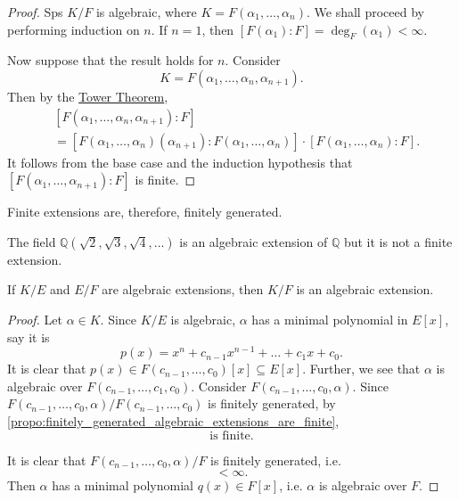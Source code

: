 \documentclass[notoc,notitlepage,nobib]{tufte-book}
\begin{document}
\begin{proof}
  Sps $K / F$ is algebraic, where $K = F(\alpha_1, \ldots, \alpha_n)$. We shall proceed by performing
  induction on $n$. If $n = 1$, then $[F(\alpha_1) : F] = \deg_F(\alpha_1) < \infty$.

  Now suppose that the result holds for $n$. Consider 
  \begin{equation*}
    K = F(\alpha_1, \ldots, \alpha_n, \alpha_{n + 1}).
  \end{equation*}
  Then by the \hyperref[thm:tower_theorem]{Tower Theorem},
  \begin{align*}
    &[F(\alpha_1, \ldots, \alpha_n, \alpha_{n + 1}) : F] \\
    &= [F(\alpha_1, \ldots, \alpha_{n})(\alpha_{n + 1}) : F(\alpha_1, \ldots,
    \alpha_n)] \cdot [F(\alpha_1, \ldots, \alpha_n) : F].
  \end{align*}
  It follows from the base case and the induction hypothesis that \\
  \noindent
  $[F(\alpha_1, \ldots, \alpha_{n+1}):F]$ is finite.
\end{proof}

\begin{note}
  Finite extensions are, therefore, finitely generated.
\end{note}

\begin{warning}
  The field $\mathbb{Q}(\sqrt{2}, \sqrt{3}, \sqrt{4}, \ldots)$ is an algebraic extension of $\mathbb{Q}$
  but it is not a finite extension.
\end{warning}

\begin{propo}\label{propo:greater_algebraic_extensions}
  If $K / E$ and $E / F$ are algebraic extensions, then $K / F$ is an algebraic extension.
\end{propo}

\begin{proof}
  Let $\alpha \in K$. Since $K / E$ is algebraic, $\alpha$ has a minimal polynomial in $E[x]$, say it is
  \begin{equation*}
    p(x) = x^n + c_{n - 1} x^{n - 1} + \hdots + c_1 x + c_0.
  \end{equation*}
  It is clear that $p(x) \in F(c_{n-1}, \ldots, c_0)[x] \subseteq E[x]$.
  Further, we see that $\alpha$ is algebraic over $F(c_{n - 1}, \ldots, c_1,
  c_0)$. Consider $F(c_{n-1}, \ldots, c_0, \alpha)$. Since $F(c_{n-1}, \ldots,
  c_0, \alpha) / F(c_{n-1}, \ldots, c_0)$ is finitely generated, by
  \cref{propo:finitely_generated_algebraic_extensions_are_finite},
  \begin{equation*}
    [F(c_{n - 1}, \ldots, c_1, c_0, \alpha) : F(c_{n - 1}, \ldots, c_0)] \text{
    is finite}.
  \end{equation*}
  
  It is clear that $F(c_{n-1}, \ldots, c_0, \alpha) / F$ is finitely generated,
  i.e.
  \begin{equation*}
    [F(c_{n - 1}, \ldots, c_0, \alpha) : F] < \infty.
  \end{equation*}
  Then $\alpha$ has a minimal polynomial $q(x) \in F[x]$, i.e. $\alpha$ is
  algebraic over $F$.
\end{proof}
\end{document}
